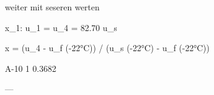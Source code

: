 weiter mit seseren werten  

x_1:  
u_1 = u_4 = 82.70 u_s  

x = (u_4 - u_f (-22°C)) / (u_s (-22°C) - u_f (-22°C))  

A-10  
1  
0.3682  

---